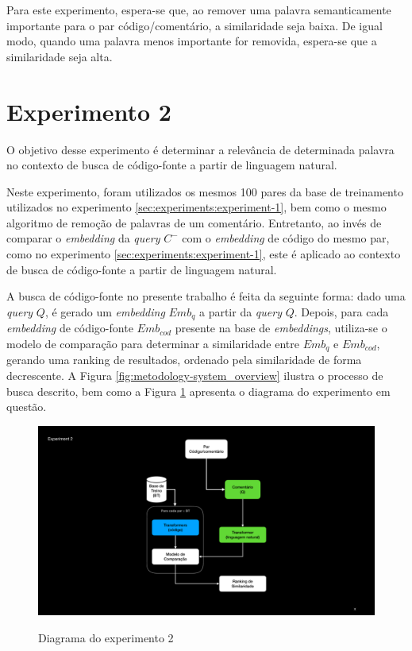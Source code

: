 Para este experimento, espera-se que, ao remover uma palavra semanticamente importante para o par código/comentário, a similaridade seja baixa. De igual modo, quando uma palavra menos importante for removida, espera-se que a similaridade seja alta.

\section{Experimento 2}
\label{sec:experiments:experiment-2}
O objetivo desse experimento é determinar a relevância de determinada palavra no contexto de busca de código-fonte a partir de linguagem natural.

Neste experimento, foram utilizados os mesmos 100 pares da base de treinamento utilizados no experimento \ref{sec:experiments:experiment-1}, bem como o mesmo algoritmo de remoção de palavras de um comentário. Entretanto, ao invés de comparar o \textit{embedding} da \textit{query} $C^-$ com o \textit{embedding} de código do mesmo par, como no experimento \ref{sec:experiments:experiment-1}, este é aplicado ao contexto de busca de código-fonte a partir de linguagem natural.

A busca de código-fonte no presente trabalho é feita da seguinte forma: dado uma \textit{query} $Q$, é gerado um \textit{embedding} $Emb_q$ a partir da \textit{query} $Q$. Depois, para cada \textit{embedding} de código-fonte $Emb_{cod}$ presente na base de \textit{embeddings}, utiliza-se o modelo de comparação para determinar a similaridade entre $Emb_q$ e $Emb_{cod}$, gerando uma ranking de resultados, ordenado pela similaridade de forma decrescente. A Figura \ref{fig:metodology-system_overview} ilustra o processo de busca descrito, bem como a Figura \ref{fig:experiment-2-diagram} apresenta o diagrama do experimento em questão.

\begin{figure}[H]
    \centering
        \caption{Diagrama do experimento 2}
        \includegraphics[scale=0.5]{imagens/proposta-experimental/experiment-2.pdf}
        \label{fig:experiment-2-diagram}
\end{figure}

